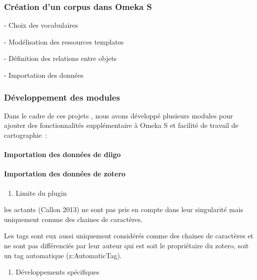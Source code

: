 \documentclass[
  letterpaper,
  DIV=11,
  numbers=noendperiod]{scrreprt}
\let\oldparagraph\paragraph
\renewcommand{\paragraph}[1]{\oldparagraph{#1}\mbox{}}
\providecommand{\tightlist}{%
  \setlength{\itemsep}{0pt}\setlength{\parskip}{0pt}}\usepackage{longtable,booktabs,array}
\begin{document}
\hypertarget{cruxe9ation-dun-corpus-dans-omeka-s}{%
\subsubsection{Création d'un corpus dans Omeka
S}\label{cruxe9ation-dun-corpus-dans-omeka-s}}

- Choix des vocabulaires

- Modélisation des ressources templates

- Définition des relations entre objets

- Importation des données

\hypertarget{duxe9veloppement-des-modules}{%
\subsubsection{Développement des
modules}\label{duxe9veloppement-des-modules}}

Dans le cadre de ces projets , nous avons développé plusieurs modules
pour ajouter des fonctionnalités supplémentaire à Omeka S et facilité de
travail de cartographie~:

\hypertarget{sec-importDiigo}{%
\paragraph{Importation des données de diigo}\label{sec-importDiigo}}

\hypertarget{importation-des-donnuxe9es-de-zotero}{%
\paragraph{Importation des données de
zotero}\label{importation-des-donnuxe9es-de-zotero}}

\begin{enumerate}
\def\labelenumi{\arabic{enumi}.}
\tightlist
\item
  Limite du plugin
\end{enumerate}

les actants (Callon 2013) ne sont pas pris en compte dans leur
singularité mais uniquement comme des chaines de caractères.

Les tags sont eux aussi uniquement considérés comme des chaines de
caractères et ne sont pas différenciés par leur auteur qui est soit le
propriétaire du zotero, soit un tag automatique (z:AutomaticTag).

\begin{enumerate}
\def\labelenumi{\arabic{enumi}.}
\tightlist
\item
  Développements spécifiques
\end{enumerate}
\end{document}
